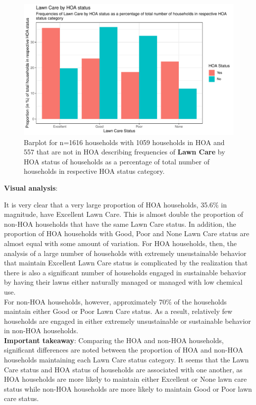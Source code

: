 \documentclass{article}
\begin{document}
\begin{figure}[H]
\centering
\includegraphics{part2-015}
\caption{Barplot for n=1616 households with 1059 households in HOA and 557 that are not in HOA describing
frequencies of \textbf{Lawn Care} by HOA status of households as a percentage of total number of households in respective HOA status category.} \label{Fig:Plot1}
\end{figure}

\textbf{Visual analysis}:

It is very clear that a very large proportion of HOA households, 35.6\% in magnitude, have Excellent Lawn Care. This is almost double the proportion of non-HOA households that have the same Lawn Care status. In addition, the proportion of HOA households with Good, Poor and None Lawn Care status are almost equal with some amount of variation. For HOA households, then, the analysis of a large number of households with extremely unsustainable behavior that maintain Excellent Lawn Care status is complicated by the realization that there is also a significant number of households engaged in sustainable behavior by having their lawns either naturally managed or managed with low chemical use.\\

For non-HOA households, however, approximately 70\% of the households maintain either Good or Poor Lawn Care status. As a result, relatively few households are engaged in either extremely unsustainable or sustainable behavior in non-HOA households.\\

\textbf{Important takeaway}: Comparing the HOA and non-HOA households, significant differences are noted between the proportion of HOA and non-HOA households maintaining each Lawn Care status category. It seems that the Lawn Care status and HOA status of households are associated with one another, as HOA households are more likely to maintain either Excellent or None lawn care status while non-HOA households are more likely to maintain Good or Poor lawn care status. \\
\end{document}
